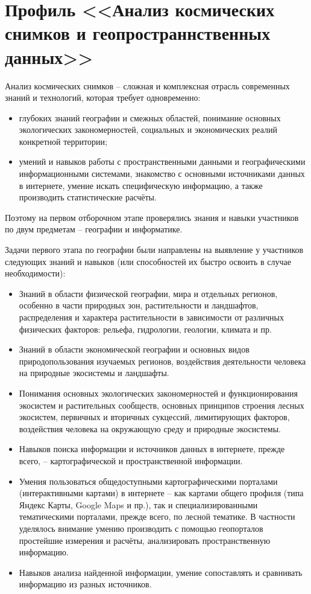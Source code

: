 

\section*{Профиль <<Анализ космических снимков и геопространнственных данных>>}

Анализ космических снимков – сложная и комплексная отрасль современных знаний и технологий, которая требует одновременно:
\begin{itemize}
    \item глубоких знаний географии и смежных областей, понимание основных экологических закономерностей, социальных и экономических реалий конкретной территории; 
    \item умений и навыков работы с пространственными данными и географическими информационными системами, знакомство с основными источниками данных в интернете, умение искать специфическую информацию, а также производить статистические расчёты.
\end{itemize}

Поэтому на первом отборочном этапе проверялись знания и навыки участников по двум предметам – географии и информатике. 

Задачи первого этапа по географии были направлены на выявление у участников следующих знаний и навыков (или способностей их быстро освоить в случае необходимости):
\begin{itemize}
    \item Знаний в области физической географии, мира и отдельных регионов, особенно в части природных зон, растительности и ландшафтов, распределения и характера растительности в зависимости от различных физических факторов: рельефа, гидрологии, геологии, климата и пр.
    \item Знаний в области экономической географии и основных видов природопользования изучаемых регионов, воздействия деятельности человека на природные экосистемы и ландшафты.
    \item Понимания основных экологических закономерностей и функционирования экосистем и растительных сообществ, основных принципов строения лесных экосистем, первичных и вторичных сукцессий, лимитирующих факторов, воздействия человека на окружающую среду и природные экосистемы.
    \item Навыков поиска информации и источников данных в интернете, прежде всего, – картографической и пространственной информации.
    \item Умения пользоваться общедоступными картографическими порталами (интерактивными картами) в интернете – как картами общего профиля (типа Яндекс Карты, Google Maps и пр.), так и специализированными тематическими порталами, прежде всего, по лесной тематике. В частности уделялось внимание умению производить с помощью геопорталов простейшие измерения и расчёты, анализировать пространственную информацию.
    \item Навыков анализа найденной информации, умение сопоставлять и сравнивать информацию из разных источников.
\end{itemize}

